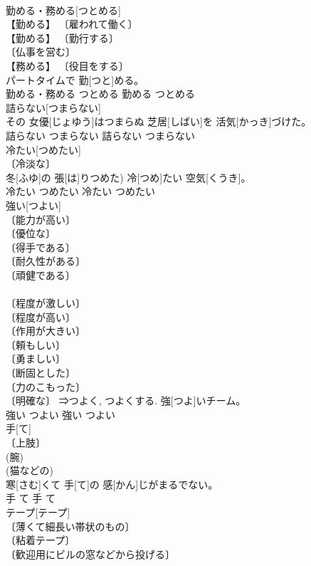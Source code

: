 \documentclass[8pt]{extreport}
\begin{document}
\begin{CJK}{UTF8}{min}
\\	勤める・務める[つとめる]	
\\	【勤める】 〔雇われて働く〕 
\\	【勤める】 〔勤行する〕 
\\	〔仏事を営む〕 
\\	【務める】 〔役目をする〕 
\\	パートタイムで 勤[つと]める。	
\\	勤める・務める	つとめる	勤める	つとめる	
\\	詰らない[つまらない]	
\\	その 女優[じょゆう]はつまらぬ 芝居[しばい]を 活気[かっき]づけた。	
\\	詰らない	つまらない	詰らない	つまらない	
\\	冷たい[つめたい]	
\\	〔冷淡な〕 
\\	冬[ふゆ]の 張[は]りつめた) 冷[つめ]たい 空気[くうき]。	
\\	冷たい	つめたい	冷たい	つめたい	
\\	強い[つよい]	
\\	〔能力が高い〕 
\\	〔優位な〕 
\\	〔得手である〕 
\\	〔耐久性がある〕 
\\	〔頑健である〕 
\\	[⇒つよくする] 
\\	〔程度が激しい〕 
\\	〔程度が高い〕 
\\	〔作用が大きい〕 
\\	〔頼もしい〕 
\\	〔勇ましい〕 
\\	〔断固とした〕 
\\	〔力のこもった〕 
\\	〔明確な〕 ⇒つよく, つよくする.	強[つよ]いチーム。	
\\	強い	つよい	強い	つよい	
\\	手[て]	
\\	〔上肢〕 
\\	(腕) 
\\	(猫などの) 
\\	寒[さむ]くて 手[て]の 感[かん]じがまるでない。	
\\	手	て	手	て	
\\	テープ[テープ]	
\\	〔薄くて細長い帯状のもの〕 
\\	〔粘着テープ〕 
\\	〔歓迎用にビルの窓などから投げる〕 

\end{CJK}
\end{document}
